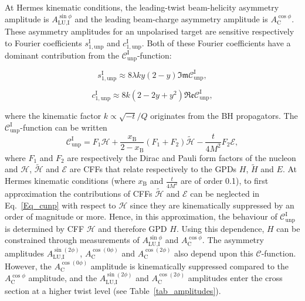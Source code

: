 At H{\sc ermes} kinematic conditions, the leading-twist beam-helicity asymmetry amplitude is $A_{\textrm{LU,I}}^{\sin\phi}$ and the leading beam-charge asymmetry amplitude is $A^{\cos\phi}_{\textrm{C}}$. These asymmetry amplitudes\blue{,} for an unpolarised target\blue{,} are sensitive respectively to Fourier coefficients $s_{1,\textrm{unp}}^{\textrm{I}}$ and $c_{1,\textrm{unp}}^{\textrm{I}}$. Both of these Fourier coefficients have a dominant contribution from the $\mathcal{C}_{\textrm{unp}}^{\textrm{I}}$-function:
\begin{center}
\begin{equation}
 s_{1,\textrm{unp}}^{\textrm{I}} \approx 8\lambda ky(2-y)\mathfrak{Im}\mathcal{C}_{\textrm{unp}}^{\textrm{I}},
\label{eq:s1}
\end{equation}
\end{center}
\begin{center}
\begin{equation}
 c_{1,\textrm{unp}}^{\textrm{I}} \approx 8k(2- 2y + y^{2})\mathfrak{Re}\mathcal{C}_{\textrm{unp}}^{\textrm{I}},
\label{eq:c1}
\end{equation}
\end{center}
where the kinematic factor $k \propto \sqrt{-t}/Q$ originates from the BH
propagators. The $\mathcal{C}_{\textrm{unp}}^{\textrm{I}}$-function can be
written
\cite{Bel02b} 
\begin{equation}
 \mathcal{C}_{\textrm{unp}}^{\textrm{I}} = F_{1}\mathcal{H} + \frac{x_{\textrm{B}}}{2-x_{\textrm{B}}}(F_{1}+F_{2})\widetilde{\mathcal{H}} -\frac{t}{4M^{2}}F_{2}\mathcal{E},
\label{Eq_cunp}
\end{equation}
where $F_{1}$ and $F_{2}$ are respectively the Dirac and Pauli form
factors of the nucleon and $\mathcal{H}$, $\widetilde{\mathcal{H}}$ and
$\mathcal{E}$ are CFFs that relate respectively to the GPDs $H$,
$\widetilde{H}$ and $E$.  At H{\sc ermes} kinematic
conditions (where $x_{\textrm{B}}$ and $\frac{t}{4M^2}$ are of order 0.1), to first approximation the
contributions of CFFs $\widetilde{\mathcal{H}}$ and $\mathcal{E}$ can be
neglected in Eq.~\ref{Eq_cunp} with respect to $\mathcal{H}$ since they
are kinematically suppressed by an order of magnitude or more.
Hence, in this approximation, the behaviour of
$\mathcal{C}_{\textrm{unp}}^{\textrm{I}}$ is determined by CFF $\mathcal{H}$
and therefore GPD $H$. Using this dependence, $H$ can be constrained through
measurements of $A_{\textrm{LU,I}}^{\sin\phi}$ and $A^{\cos\phi}_{\textrm{C}}$.
The asymmetry amplitudes $A_{\textrm{LU},\textrm{I}}^{\sin(2\phi)}$,
$A^{\cos(0\phi)}_{\textrm{C}}$ and $A^{\cos(2\phi)}_{\textrm{C}}$ also depend
upon this $\mathcal{C}$-function. However, the $A^{\cos(0\phi)}_{\textrm{C}}$ amplitude is kinematically suppressed compared to the $A^{\cos\phi}_{\textrm{C}}$ amplitude, and the  $A_{\textrm{LU,I}}^{\sin(2\phi)}$ and $A^{\cos(2\phi)}_{\textrm{C}}$ amplitudes enter the cross section at a higher
twist level (see Table~\ref{tab_amplitudes}).

